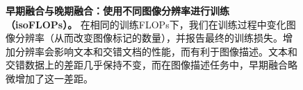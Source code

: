 \begin{figure}[t!]
    \centering
    \captionsetup{type=figure}
    \begin{subfigure}[t]{0.48\linewidth}
        
    \end{subfigure}
    \begin{subfigure}[t]{0.48\linewidth}
        
    \end{subfigure}
    \vspace{-7pt}
    \caption{\textbf{早期融合与晚期融合：使用不同图像分辨率进行训练（isoFLOPs）。} 在相同的训练FLOPs下，我们在训练过程中变化图像分辨率（从而改变图像标记的数量），并报告最终的训练损失。增加分辨率会影响文本和交错文档的性能，而有利于图像描述。文本和交错数据上的差距几乎保持不变，而在图像描述任务中，早期融合略微增加了这一差距。}
    \label{fig:early_vs_late_imageres}
\end{figure}

